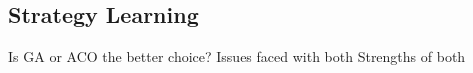 \subsection{Strategy Learning}
Is GA or ACO the better choice?
Issues faced with both
Strengths of both

